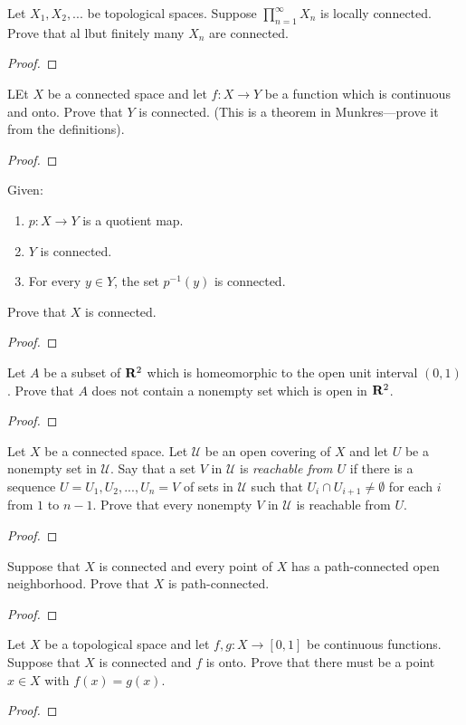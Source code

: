 \begin{problem}
Let $X_1,X_2,...$ be topological spaces. Suppose
$\prod_{n=1}^\infty X_n$ is locally connected. Prove that al lbut
finitely many $X_n$ are connected.
\end{problem}
\begin{proof}
\end{proof}
\begin{problem}
LEt $X$ be a connected space and let $f\colon X\to Y$ be a
function which is continuous and onto. Prove that $Y$ is
connected. (This is a theorem in Munkres---prove it from the
definitions).
\end{problem}
\begin{proof}
\end{proof}
\begin{problem}
Given:
\begin{enumerate}[noitemsep,label=(\roman*)]
\item $p\colon X\to Y$ is a quotient map.
\item $Y$ is connected.
\item For every $y\in Y$, the set $p^{-1}(y)$ is connected.
\end{enumerate}
Prove that $X$ is connected.
\end{problem}
\begin{proof}
\end{proof}
\begin{problem}
Let $A$ be a subset of $\mathbf{R}^2$ which is homeomorphic to the open
unit interval $(0,1)$. Prove that $A$ does not contain a nonempty
set which is open in $\mathbf{R}^2$.
\end{problem}
\begin{proof}
\end{proof}
\begin{problem}
Let $X$ be a connected space. Let $\mathcal{U}$ be an open
covering of $X$ and let $U$ be a nonempty set in
$\mathcal{U}$. Say that a set $V$ in $\mathcal{U}$ is
\emph{reachable from $U$} if there is a sequence
$U=U_1,U_2,...,U_n=V$ of sets in $\mathcal{U}$ such that $U_i\cap
U_{i+1}\neq\emptyset$ for each $i$ from $1$ to $n-1$. Prove that
every nonempty $V$ in $\mathcal{U}$ is reachable from $U$.
\end{problem}
\begin{proof}
\end{proof}
\begin{problem}
Suppose that $X$ is connected and every point of $X$ has a
path-connected open neighborhood. Prove that $X$ is
path-connected.
\end{problem}
\begin{proof}
\end{proof}
\begin{problem}
Let $X$ be a topological space and let $f,g\colon X\to[0,1]$ be
continuous functions. Suppose that $X$ is connected and $f$ is
onto. Prove that there must be a point $x\in X$ with
$f(x)=g(x)$.
\end{problem}
\begin{proof}
\end{proof}

